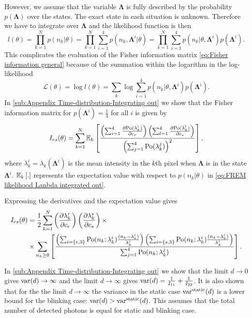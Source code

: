 However, we assume that the variable $\bm{\Lambda}$ is fully described by the probability $p(\bm{\Lambda})$ over the states. The exact state in each situation is unknown. Therefore we have to integrate over $\bm{\Lambda}$ and the likelihood function is then
%
\begin{equation}
	l(\theta)=\prod_{k=1}^Np(n_k|\theta)=\prod_{k=1}^N\sum_{i=1}^4p(n_k,\bm{\Lambda}^i|\theta)=\prod_{k=1}^N\sum_{i=1}^4p(n_k|\theta,\bm{\Lambda}^i)p(\bm{\Lambda}^i).
	\label{eq:FREM likelihood Lanbda integrated out}
\end{equation}
%
This complicates the evaluation of the Fisher information matrix \autoref{eq:Fisher information general} because of the summation within the logarithm in the log-likelihood
%
\begin{equation}
	\mathcal{L}(\theta)=\log l(\theta)=\sum_k\log\sum_{i=1}^4p(n_k|\theta,\bm{\Lambda}^i)p(\bm{\Lambda}^i).
\end{equation}
%
In \autoref{sub:Appendix Time-distribution-Integrating out} we show that the Fisher information matrix for $p(\bm{\Lambda}^i)=\frac{1}{4}$ for all $i$ is given by
%
\begin{equation}
	I_{rs}(\theta) =\sum_{k=1}^N\mathbb{E}_k\left[\frac{\left(\sum_{i=1}^4\frac{\partial\mathrm{Po}(\lambda_k^i)}{\partial c_r}\right)\left(\sum_{l=1}^4\frac{\partial\mathrm{Po}(\lambda_k^l)}{\partial c_s}\right)}{\left(\sum_{j=1}^4\mathrm{Po}(\lambda_k^j)\right)^2}\right],
	\label{eq:Fisher Information Blinking Integrating Out}
\end{equation}
%
where $\lambda_k^i=\lambda_k(\bm{\Lambda}^i)$ is the mean intensity in the $k$th pixel when $\bm{\Lambda}$ is in the state $\bm{\Lambda}^i$. $\mathbb{E}_k\left[.\right]$ represents the expectation value with respect to $p(n_k|\theta)$ in \autoref{eq:FREM likelihood Lanbda integrated out}.

Expressing the derivatives and the expectation value gives
%
\begin{alignat}{2}
	I_{rs}(\theta)&=\frac{1}{2}\sum_{k=1}^N\left(\frac{\partial\lambda_k^r}{\partial c_r}\right)\left(\frac{\partial\lambda_k^s}{\partial c_s}\right)\times\\
	&\times \sum_{n_k\geq0}\left[\frac{\left(\sum_{i=\{r,3\}}\mathrm{Po}(n_k;\lambda_k^i)\frac{(n_k-\lambda_k^i)}{\lambda_k^i}\right)\left(\sum_{i=\{s,3\}}\mathrm{Po}(n_k;\lambda_k^i)\frac{(n_k-\lambda_k^i)}{\lambda_k^i}\right)}{\sum_{j=1}^4\mathrm{Po}(n_k;\lambda_k^j)}\right].
\end{alignat}

In \autoref{sub:Appendix Time-distribution-Integrating out} we show that the limit $d\rightarrow0$ gives $\mathrm{var}(d)\rightarrow\infty$ and the limit $d\rightarrow\infty$ gives $\mathrm{var}(d)=\frac{1}{I_{11}}+\frac{1}{I_{22}}$. It is also shown that for the the limit $d\rightarrow\infty$ the variance in the static case $\mathrm{var}^{\text{static}}(d)$ is a lower bound for the blinking case: $\mathrm{var}(d)>\mathrm{var}^{\text{static}}(d)$. This assumes that the total number of detected photons is equal for static and blinking case. 

